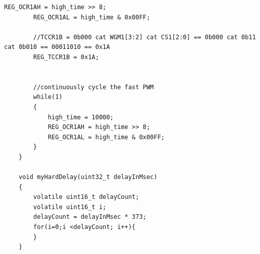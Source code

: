 \documentclass[11pt,pdftex,portrait,letterpaper]{article}
\begin{document}
\begin{lstlisting}[caption={Program 2}, label=l:programx]
		REG_OCR1AH = high_time >> 8;
		REG_OCR1AL = high_time & 0x00FF;
		
		//TCCR1B = 0b000 cat WGM1[3:2] cat CS1[2:0] == 0b000 cat 0b11 cat 0b010 == 00011010 == 0x1A
		REG_TCCR1B = 0x1A;
		
		
		//continuously cycle the fast PWM 
		while(1)
		{
			high_time = 10000;
			REG_OCR1AH = high_time >> 8;
			REG_OCR1AL = high_time & 0x00FF;
		}
	}
	
	void myHardDelay(uint32_t delayInMsec)
	{
		volatile uint16_t delayCount;
		volatile uint16_t i;
		delayCount = delayInMsec * 373;
		for(i=0;i <delayCount; i++){
		}
	}
		
	\end{lstlisting}
	

	
	
\end{document}

